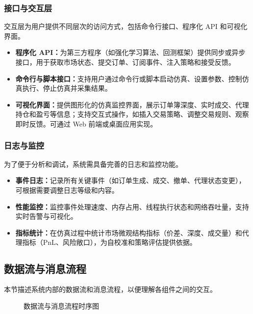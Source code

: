 \subsubsection{接口与交互层}

交互层为用户提供不同层次的访问方式，包括命令行接口、程序化 API 和可视化界面。

\begin{itemize}
  \item \textbf{程序化 API：}为第三方程序（如强化学习算法、回测框架）提供同步或异步接口，用于获取市场状态、提交订单、订阅事件、注入策略和接受反馈。
  \item \textbf{命令行与脚本接口：}支持用户通过命令行或脚本启动仿真、设置参数、控制仿真执行、停止仿真并采集结果。
  \item \textbf{可视化界面：}提供图形化的仿真监控界面，展示订单簿深度、实时成交、代理持仓和盈亏等信息；支持交互式操作，如插入交易策略、调整交易规则、观察即时反馈。可通过 Web 前端或桌面应用实现。
\end{itemize}

\subsubsection{日志与监控}

为了便于分析和调试，系统需具备完善的日志和监控功能。

\begin{itemize}
  \item \textbf{事件日志：}记录所有关键事件（如订单生成、成交、撤单、代理状态变更），可根据需要调整日志等级和内容。
  \item \textbf{性能监控：}监控事件处理速度、内存占用、线程执行状态和网络吞吐量，支持实时告警与可视化。
  \item \textbf{指标统计：}在仿真过程中统计市场微观结构指标（价差、深度、成交量）和代理指标（PnL、风险敞口），为自校准和策略评估提供依据。
\end{itemize}

\subsection{数据流与消息流程}

本节描述系统内部的数据流和消息流程，以便理解各组件之间的交互。

\begin{figure}[htbp]
  \centering
  \resizebox{\linewidth}{!}{}
  \caption{数据流与消息流程时序图}
  \label{fig:message_flow}
\end{figure}

